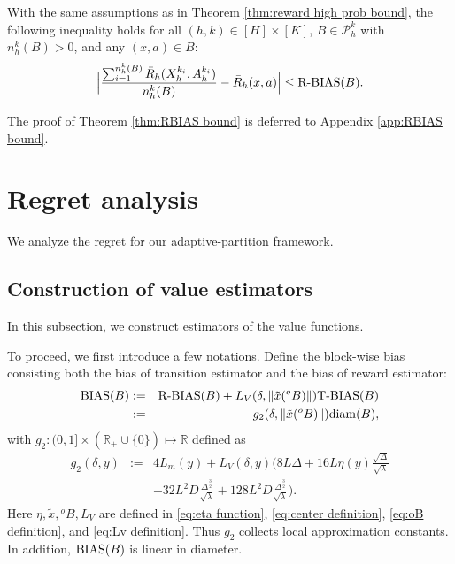 \documentclass[final,supplement]{siamart251216}
\begin{document}
\begin{theorem}\label{thm:RBIAS bound}
    With the same assumptions as in Theorem \ref{thm:reward high prob bound}, the following inequality holds for all $(h,k)\in [H]\times [K]$, $B \in \mathcal{P}_h^k$ with $n_{h}^{k}(B)>0$, and any $(x,a) \in B$:
    \begin{eqnarray}\label{eq:RBIAS bound}
\Big|\frac{\sum_{i=1}^{n_h^k(B)}\bar{R}_{h}(X_{h}^{k_{i}},A_{h}^{k_{i}})}{n_h^k(B)}-\bar{R}_h(x,a)\Big|\leq \mbox{\rm R-BIAS}(B). 
    \end{eqnarray}
\end{theorem}
The proof of Theorem \ref{thm:RBIAS bound} is deferred to Appendix \ref{app:RBIAS bound}.







\section{Regret analysis}\label{sec:regret_analysis}\label{sec:5}
We analyze the regret for our adaptive-partition framework.


\subsection{Construction of value estimators}

In this subsection, we construct estimators of the value functions.

To proceed, we first introduce a few notations. Define the block-wise bias consisting both the bias of transition estimator and the  bias of reward estimator:
\begin{eqnarray}\label{eq:BIAS}
    {\rm BIAS}(B)&:=&\mbox{\rm R-BIAS}(B)+L_{V}(\delta, \|\tilde{x}(^{o}B)\|)\mbox{\rm T-BIAS}(B)\nonumber\\
    &:=&g_{2}(\delta, \|\tilde{x}(^{o}B)\|){\rm diam}(B),
\end{eqnarray}
with $g_{2}:(0,1]\times (\mathbb{R}_+\cup\{0\}) \mapsto \mathbb{R}$ defined as 
\begin{eqnarray}\label{eq:g2 definition}
   g_{2}(\delta,y)&:=&4L_m(y)+L_{V}(\delta,y)\Bigg(8L\Delta+16L\eta(y)\frac{\sqrt{\Delta}}{\sqrt{\lambda}}\nonumber\\
   &&+32L^{2}D\frac{\Delta^{\frac{3}{2}}}{\sqrt{\lambda}}+128L^{2}D\frac{\Delta^{\frac{3}{2}}}{\sqrt{\lambda}}\Bigg).
\end{eqnarray}
Here $\eta,\tilde x,{}^oB,L_V$ are defined in \eqref{eq:eta function}, \eqref{eq:center definition}, \eqref{eq:oB definition}, and \eqref{eq:Lv definition}. Thus $g_2$ collects local approximation constants. In addition, ${\rm BIAS}(B)$ is linear in diameter.
\end{document}

